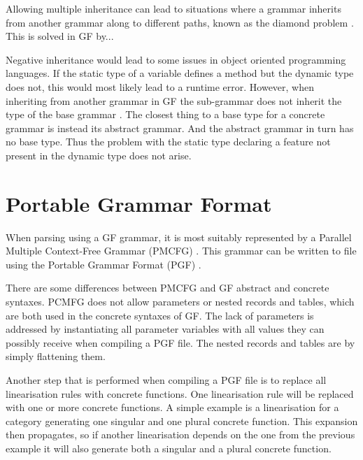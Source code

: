 Allowing multiple inheritance can lead to situations where a grammar inherits from another grammar along to different paths, known as the diamond problem \cite{diamongproblem}. This is solved in GF by... \cite{gfdiamondsolution}

Negative inheritance would lead to some issues in object oriented programming languages. If the static type \cite{statictype} of a variable defines a method but the dynamic type \cite{dynamictype} does not, this would most likely lead to a runtime error. However, when inheriting from another grammar in GF the sub-grammar does not inherit the type of the base grammar \cite{grammartype}. The closest thing to a base type for a concrete grammar is instead its abstract grammar. And the abstract grammar in turn has no base type. Thus the problem with the static type declaring a feature not present in the dynamic type does not arise.

\section{Portable Grammar Format}
When parsing using a GF grammar, it is most suitably represented by a Parallel Multiple Context-Free Grammar (PMCFG) \cite{pmcfg}. This grammar can be written to file using the Portable Grammar Format (PGF) \cite{Angelov}.

There are some differences between PMCFG and GF abstract and concrete syntaxes. PCMFG does not allow parameters or nested records and tables, which are both used in the concrete syntaxes of GF. The lack of parameters is addressed by instantiating all parameter variables with all values they can possibly receive when compiling a PGF file. The nested records and tables are by simply flattening them.

Another step that is performed when compiling a PGF file is to replace all linearisation rules with concrete functions. One linearisation rule will be replaced with one or more concrete functions. A simple example is a linearisation for a category generating one singular and one plural concrete function. This expansion then propagates, so if another linearisation depends on the one from the previous example it will also generate both a singular and a plural concrete function.
